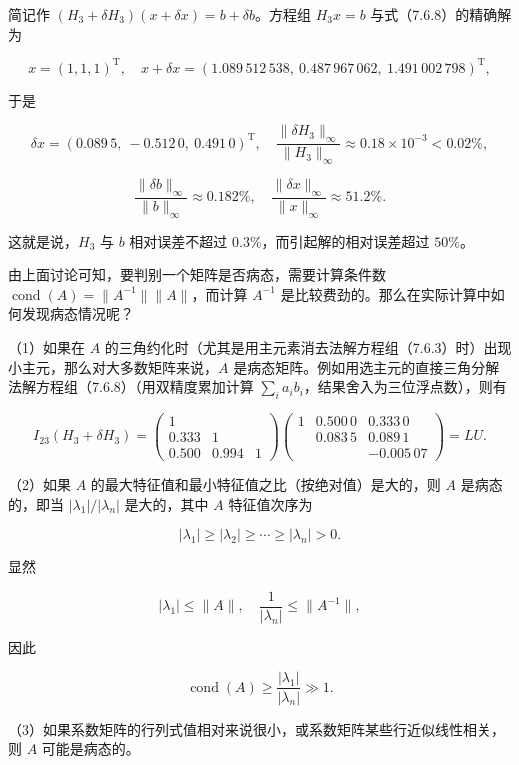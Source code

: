 \documentclass[
  10pt,
  fontset=fandol]{ctexart}
\begin{document}
简记作 \((H_3+\delta H_3)(x+\delta x)=b+\delta b\)。方程组 \(H_3x=b\)
与式（7.6.8）的精确解为

\[
x=(1,1,1)^{\mathrm T},\quad
x+\delta x=(1.089\,512\,538,\ 0.487\,967\,062,\ 1.491\,002\,798)^{\mathrm T},
\]

于是

\[
\delta x=(0.089\,5,\ -0.512\,0,\ 0.491\,0)^{\mathrm T},\quad
\frac{\|\delta H_3\|_\infty}{\|H_3\|_\infty}\approx0.18\times10^{-3}<0.02\%,
\]

\[
\frac{\|\delta b\|_\infty}{\|b\|_\infty}\approx0.182\%,\quad
\frac{\|\delta x\|_\infty}{\|x\|_\infty}\approx51.2\%.
\]

这就是说，\(H_3\) 与 \(b\) 相对误差不超过
\(0.3\%\)，而引起解的相对误差超过 \(50\%\)。

由上面讨论可知，要判别一个矩阵是否病态，需要计算条件数
\(\operatorname{cond}(A)=\|A^{-1}\|\|A\|\)，而计算 \(A^{-1}\)
是比较费劲的。那么在实际计算中如何发现病态情况呢？

（1）如果在 \(A\)
的三角约化时（尤其是用主元素消去法解方程组（7.6.3）时）出现小主元，那么对大多数矩阵来说，\(A\)
是病态矩阵。例如用选主元的直接三角分解法解方程组（7.6.8）（用双精度累加计算
\(\sum_i a_ib_i\)，结果舍入为三位浮点数），则有

\[
I_{23}(H_3+\delta H_3)
=\begin{pmatrix}
1&&\\
0.333&1&\\
0.500&0.994&1
\end{pmatrix}
\begin{pmatrix}
1&0.500\,0&0.333\,0\\
&0.083\,5&0.089\,1\\
&&\boxed{-0.005\,07}
\end{pmatrix}
=LU.
\]

（2）如果 \(A\) 的最大特征值和最小特征值之比（按绝对值）是大的，则 \(A\)
是病态的，即当 \(|\lambda_1|/|\lambda_n|\) 是大的，其中 \(A\)
特征值次序为

\[
|\lambda_1|\geqslant|\lambda_2|\geqslant\cdots\geqslant|\lambda_n|>0.
\]

显然

\[
|\lambda_1|\leqslant\|A\|,\quad\frac1{|\lambda_n|}\leqslant\|A^{-1}\|,
\]

因此

\[
\operatorname{cond}(A)\geqslant\frac{|\lambda_1|}{|\lambda_n|}\gg1.
\]

（3）如果系数矩阵的行列式值相对来说很小，或系数矩阵某些行近似线性相关，则
\(A\) 可能是病态的。
\end{document}
